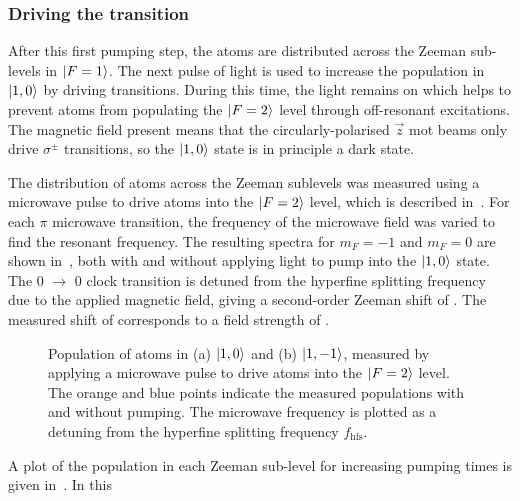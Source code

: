 \subsubsection{Driving the  transition}
After this first pumping step, the atoms are distributed across the
Zeeman sub-levels in \(\ket{F=1}\). The next pulse of light is used to
increase the population in \(\ket{1,0}\) by driving 
transitions. During this time, the  light remains on which
helps to prevent atoms from populating the \(\ket{F=2}\) level through
off-resonant  excitations. The magnetic field present
means that the circularly-polarised \(\vec{z}\) \ac{mot} beams only
drive \(\sigma^{\pm}\) transitions, so the \(\ket{1,0}\) state is in
principle a dark state. 
\par\noindent
The distribution of atoms across the Zeeman sublevels was measured
using a microwave pulse to drive atoms into the \(\ket{F=2}\) level,
which is described in~. For each \(\pi\)
microwave transition, the frequency of the microwave field was varied
to find the resonant frequency. The resulting spectra for \(m_F = -1\)
and \(m_F = 0\) are shown in~,
both with and without applying light to pump into the \(\ket{1,0}\)
state.  The 0 \(\rightarrow\) 0 clock transition is detuned from the
hyperfine splitting frequency due to the applied magnetic field,
giving a second-order Zeeman shift of
. The measured shift of
 corresponds to a field strength of
.
\begin{figure}[!htbp]
    \centering
    \def\svgwidth{\columnwidth}
    \caption[\(m_F\) populations before and after  pumping]{Population of atoms in (a) \(\ket{1,0}\) and (b) \(\ket{1,-1}\), measured by applying a  microwave pulse to drive atoms into the \(\ket{F=2}\) level. The orange and blue points indicate the measured populations with and without  pumping. The microwave frequency is plotted as a detuning from the hyperfine splitting frequency \(f_\text{hfs}\).}
    \label{fig:step2_microwave_spec}
\end{figure} 
\par\noindent
A plot of the population in each Zeeman sub-level for increasing
pumping times is given in~. In this
